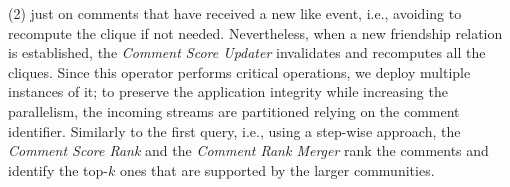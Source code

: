 (2) just on comments that have received a new like event, i.e., avoiding to recompute the clique if not needed.
%
Nevertheless, when a new friendship relation is established, the \textit{Comment Score Updater} invalidates and recomputes all the cliques.
%
Since this operator performs critical operations, we deploy multiple instances of it; to preserve the application integrity while increasing the parallelism, the incoming streams are partitioned relying on the comment identifier.
%
Similarly to the first query, i.e., using a step-wise approach, the \textit{Comment Score Rank} and the \textit{Comment Rank Merger} rank the comments and identify the top-$ k $ ones that are supported by the larger communities.


